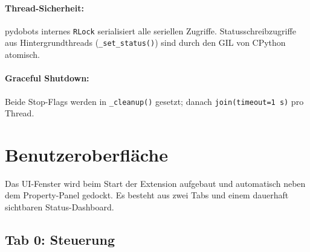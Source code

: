 \documentclass[11pt,a4paper]{article}
\begin{document}
\paragraph{Thread-Sicherheit:}
pydobots internes \texttt{RLock} serialisiert alle seriellen
Zugriffe. Statusschreibzugriffe aus Hintergrundthreads
(\texttt{\_set\_status()}) sind durch den GIL von CPython atomisch.

\paragraph{Graceful Shutdown:}
Beide Stop-Flags werden in \texttt{\_cleanup()} gesetzt;
danach \texttt{join(timeout=1\,s)} pro Thread.

\section{Benutzeroberfläche}
\label{sec:ui}

Das UI-Fenster wird beim Start der Extension aufgebaut und
automatisch neben dem Property-Panel gedockt. Es besteht aus
zwei Tabs und einem dauerhaft sichtbaren Status-Dashboard.

\subsection{Tab 0: Steuerung}
\end{document}
